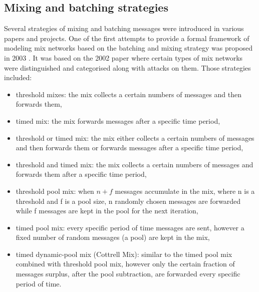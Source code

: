 \subsection{Mixing and batching strategies}
Several strategies of mixing and batching messages were introduced in various papers and projects. One of the first attempts to provide a formal framework of modeling mix networks based on the batching and mixing strategy was proposed in 2003 \cite{generalising}. It was based on the 2002 paper \cite{mix-attacks} where certain types of mix networks were distinguished and categorised along with attacks on them. Those strategies included:
\begin{itemize}
    \item threshold mixes: the mix collects a certain numbers of messages and then forwards them, 
    \item timed mix: the mix forwards messages after a specific time period,
    \item threshold or timed mix: the mix either collects a certain numbers of messages and then forwards them or forwards messages after a specific time period,
    \item threshold and timed mix: the mix collects a certain numbers of messages and forwards them after a specific time period,
    \item threshold pool mix: when $n+f$ messages accumulate in the mix, where n is a threshold and f is a pool size, n randomly chosen messages are forwarded while f messages are kept in the pool for the next iteration,
    \item timed pool mix: every specific period of time messages are sent, however a fixed number of random messages (a pool) are kept in the mix,
    \item timed dynamic-pool mix (Cottrell Mix): similar to the timed pool mix combined with threshold pool mix, however only the certain fraction of messages surplus, after the pool subtraction, are forwarded every specific period of time.
\end{itemize}

